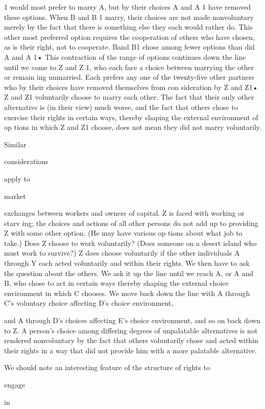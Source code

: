 \documentclass[11pt,openany]{book}
\begin{document}
1 would most prefer to marry A, but by their choices A and A 1 have removed these options. When B and B 1 marry, their choices are not made nonvoluntary merely by the fact that there is something else they each would rather do. This other most preferred option requires the cooperation of others who have chosen, as is their right, not to cooperate. Band B1 chose among fewer options than did A and A 1• This contraction of the range of options continues down the line until we come to Z and Z 1, who each face a choice between marrying the other or remain ing unmarried. Each prefers any one of the twenty-five other partners who by their choices have removed themselves from con sideration by Z and Z1• Z and Z1 voluntarily choose to marry each other. The fact that their only other alternative is (in their view) much worse, and the fact that others chose to exercise their rights in certain ways, thereby shaping the external environment of op tions in which Z and Z1 choose, does not mean they did not marry voluntarily. 

Similar 

considerations 

apply to 

market 

exchanges between workers and owners of capital. Z is faced with working or starv ing; the choices and actions of all other persons do not add up to providing Z with some other option. (He may have various op tions about what job to take.) Does Z choose to work voluntarily? (Does someone on a desert island who must work to survive?) Z does choose voluntarily if the other individuals A through Y each acted voluntarily and within their rights. We then have to ask the question about the others. We ask it up the line until we reach A, or A and B, who chose to act in certain ways thereby shaping the external choice environment in which C chooses. We move back down the line with A through C's voluntary choice affecting D's choice environment, 

and A through D's choices affecting E's choice environment, and so on back down to Z. A person's choice among differing degrees of unpalatable alternatives is not rendered nonvoluntary by the fact that others voluntarily chose and acted within their rights in a way that did not provide him with a more palatable alternative. 

We should note an interesting feature of the structure of rights to 

engage 

in 
\end{document}
